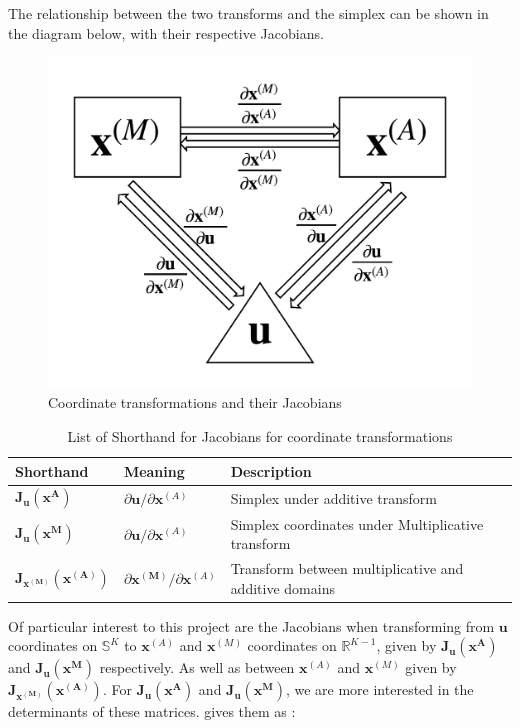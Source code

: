 The relationship between the two transforms and the simplex can be shown in the diagram below, with their respective Jacobians.

\begin{figure}[H]
\begin{center}
\includegraphics[width=.5\textwidth]{Chap4_ComputationOfIntegral/Coordinate_transformations.png}
\caption{Coordinate transformations and their Jacobians}
\label{fig:coord_transform}
\end{center}
\end{figure}

\begin{table}[H]
    \begin{center}
    \begin{tabular}{@{}lll@{}}
    \toprule
    \textbf{Shorthand} & \textbf{Meaning} & \textbf{Description} \\ \midrule
        \(\mathbf{J_u(x^{A})}\)  &  \({\partial \mathbf{u}}/{\partial \mathbf{x}^{(A)}}\)  & Simplex under additive transform  \\
        \(\mathbf{J_u(x^{M})}\) & \({\partial \mathbf{u}}/{\partial \mathbf{x}^{(A)}}\)  &  Simplex coordinates under Multiplicative transform\\
        \(\mathbf{J_{x^{(M)}}(x^{(A)})}\)  &  \({\partial \mathbf{\mathbf{x}^{(M)}}}/{\partial \mathbf{x}^{(A)}}\)  &  Transform between multiplicative and additive domains\\ \bottomrule
    \end{tabular}
    \end{center}
    \caption{List of Shorthand for Jacobians for coordinate transformations}
\end{table}

Of particular interest to this project are the Jacobians when transforming from \(\mathbf{u}\) coordinates on \(\mathbb{S}^K\) to \(\mathbf{x}^{(A)}\) and \(\mathbf{x}^{(M)}\) coordinates on \(\mathbb{R}^{K-1}\), given by \(\mathbf{J_u(x^{A})}\) and \(\mathbf{J_u(x^{M})}\) respectively. As well as between \(\mathbf{x}^{(A)}\) and \(\mathbf{x}^{(M)}\) given by \(\mathbf{J_{x^{(M)}}(x^{(A)})}\). For \(\mathbf{J_u(x^{A})}\) and \(\mathbf{J_u(x^{M})}\), we are more interested in the determinants of these matrices. \cite{Aitchison1982TheData} gives them as :

